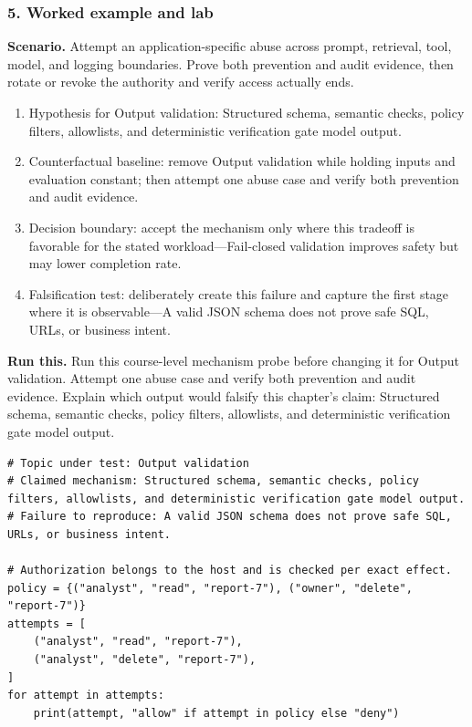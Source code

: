 \subsubsection*{5. Worked example and lab}
\textbf{Scenario.} Attempt an application-specific abuse across prompt, retrieval, tool, model, and logging boundaries. Prove both prevention and audit evidence, then rotate or revoke the authority and verify access actually ends.
\begin{enumerate}
\item Hypothesis for Output validation: Structured schema, semantic checks, policy filters, allowlists, and deterministic verification gate model output.
\item Counterfactual baseline: remove Output validation while holding inputs and evaluation constant; then attempt one abuse case and verify both prevention and audit evidence.
\item Decision boundary: accept the mechanism only where this tradeoff is favorable for the stated workload—Fail-closed validation improves safety but may lower completion rate.
\item Falsification test: deliberately create this failure and capture the first stage where it is observable—A valid JSON schema does not prove safe SQL, URLs, or business intent.
\end{enumerate}
\textbf{Run this.} Run this course-level mechanism probe before changing it for Output validation. Attempt one abuse case and verify both prevention and audit evidence. Explain which output would falsify this chapter's claim: Structured schema, semantic checks, policy filters, allowlists, and deterministic verification gate model output.
\begin{Verbatim}[fontsize=\scriptsize]
# Topic under test: Output validation
# Claimed mechanism: Structured schema, semantic checks, policy filters, allowlists, and deterministic verification gate model output.
# Failure to reproduce: A valid JSON schema does not prove safe SQL, URLs, or business intent.

# Authorization belongs to the host and is checked per exact effect.
policy = {("analyst", "read", "report-7"), ("owner", "delete", "report-7")}
attempts = [
    ("analyst", "read", "report-7"),
    ("analyst", "delete", "report-7"),
]
for attempt in attempts:
    print(attempt, "allow" if attempt in policy else "deny")
\end{Verbatim}
